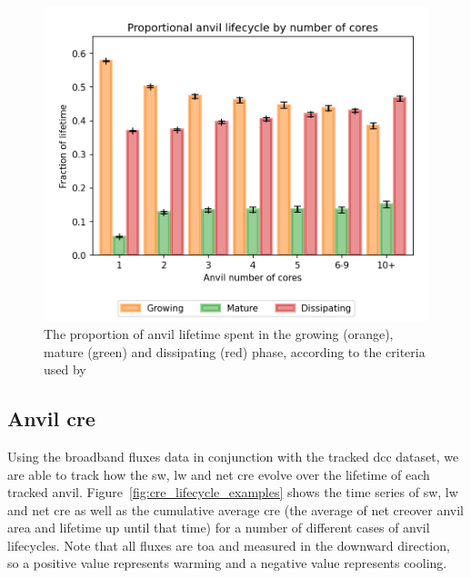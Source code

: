 \documentclass[acp, manuscript]{copernicus}
\begin{document}
\begin{figure}[tp]
    \includegraphics[width=12cm]{figures/fig09.png}
    \caption[
    The proportion of anvil lifetime spent in the growing, mature and dissipating phase
    ]{
    The proportion of anvil lifetime spent in the growing (orange), mature (green) and dissipating (red) phase, according to the criteria used by \citet{futyan_deep_2007}
    }
    \label{fig:seviri_lifetime_proportions}
\end{figure}


\subsection{Anvil \acrshort{cre}}

Using the broadband fluxes data in conjunction with the tracked \acrshort{dcc} dataset, we are able to track how the \acrshort{sw}, \acrshort{lw} and net \acrshort{cre} evolve over the lifetime of each tracked anvil. 
Figure~\ref{fig:cre_lifecycle_examples} shows the time series of \acrshort{sw}, \acrshort{lw} and net \acrshort{cre} as well as the cumulative average \acrshort{cre} (the average of net \acrshort{cre}over anvil area and lifetime up until that time) for a number of different cases of anvil lifecycles. 
Note that all fluxes are \acrshort{toa} and measured in the downward direction, so a positive value represents warming and a negative value represents cooling.
\end{document}
